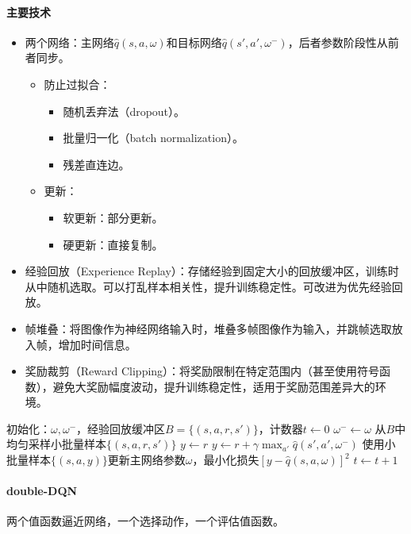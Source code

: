 \documentclass[
12pt, %
a4paper, 
oneside, %
headinclude,footinclude, %
]{scrartcl}
\begin{document}
\paragraph{主要技术}
\begin{itemize}
\item 两个网络：主网络$ \hat{q}(s, a, \omega) $和目标网络$ \hat{q}(s', a', \omega^-) $，后者参数阶段性从前者同步。
\begin{itemize}
\item 防止过拟合：
\begin{itemize}
\item 随机丢弃法（dropout）。
\item 批量归一化（batch normalization）。
\item 残差直连边。
\end{itemize}
\item 更新：
\begin{itemize}
\item 软更新：部分更新。
\item 硬更新：直接复制。
\end{itemize}
\end{itemize}
\item 经验回放（Experience Replay）：存储经验到固定大小的回放缓冲区，训练时从中随机选取。可以打乱样本相关性，提升训练稳定性。可改进为优先经验回放。
\item 帧堆叠：将图像作为神经网络输入时，堆叠多帧图像作为输入，并跳帧选取放入帧，增加时间信息。
\item 奖励裁剪（Reward Clipping）：将奖励限制在特定范围内（甚至使用符号函数），避免大奖励幅度波动，提升训练稳定性，适用于奖励范围差异大的环境。
\end{itemize}
\begin{myalgorithm}[DQN]
\State 初始化：$ \omega, \omega^- $，经验回放缓冲区$ B = \{(s, a, r, s')\} $，计数器$ t \gets 0 $
\Loop
{} 
\State $ \omega^- \gets \omega $
\EndIf
\State 从$ B $中均匀采样小批量样本$ \{(s, a, r, s')\} $
\State $ y \gets r $
\Else
\State $ y \gets r + \gamma \max_{a'} \hat{q}(s', a', \omega^-) $ 
\EndIf
\EndFor
\State 使用小批量样本$ \{(s, a, y)\} $更新主网络参数$ \omega $，最小化损失$ [y - \hat{q}(s, a, \omega)]^2 $
\State $ t \gets t + 1 $
\EndLoop
\end{myalgorithm}
\paragraph{double-DQN}
两个值函数逼近网络，一个选择动作，一个评估值函数。
\end{document}
